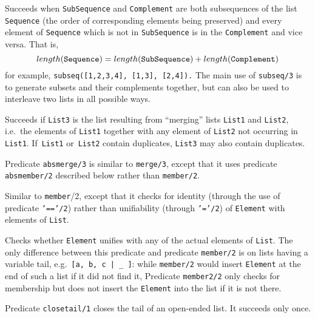 \begin{description}
    Succeeds when {\tt SubSequence} and {\tt Complement} are both
    subsequences of the list {\tt Sequence} (the order of corresponding
    elements being preserved) and every element of {\tt Sequence} which
    is not in {\tt SubSequence} is in the {\tt Complement} and vice
    versa.  That is,
    \[ length({\tt Sequence}) =
                length({\tt SubSequence})+length({\tt Complement}) \]
    for example, {\tt subseq([1,2,3,4], [1,3], [2,4]).}
    The main use of {\tt subseq/3} is to generate subsets and their
    complements together, but can also be used to interleave two lists
    in all possible ways.

    Succeeds if {\tt List3} is the list resulting from ``merging'' lists 
    {\tt List1} and {\tt List2},
    i.e.\ the elements of {\tt List1} together with any element of 
    {\tt List2} not occurring in {\tt List1}.
    If~{\tt List1} or~{\tt List2} contain duplicates, {\tt List3} may 
    also contain duplicates.

    Predicate {\tt absmerge/3} is similar to {\tt merge/3}, except that 
    it uses predicate {\tt absmember/2} described below rather than 
    {\tt member/2}.

    Similar to {\tt member}/2, except that it checks for identity
    (through the use of predicate {\tt '=='/2}) rather than unifiability 
    (through {\tt '='/2}) of {\tt Element} with elements of {\tt List}.

    Checks whether {\tt Element} unifies with any of the actual elements 
    of {\tt List}.  The only difference between this predicate and 
    predicate {\tt member/2} is on lists having a variable tail, 
    e.g.\ \verb'[a, b, c | _ ]': while {\tt member/2} would insert 
    {\tt Element} at the end of such a list if it did not find it, 
    Predicate {\tt member2/2} only checks for membership but does not 
    insert the {\tt Element} into the list if it is not there.

    Predicate {\tt closetail/1} closes the tail of an open-ended list.
    It succeeds only once.

\end{description}

